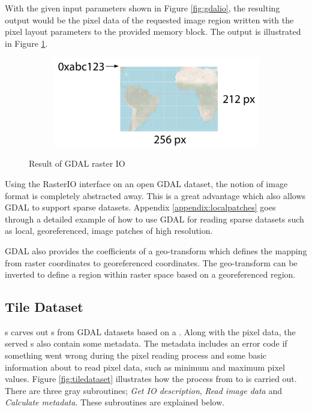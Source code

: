 With the given input parameters shown in Figure \ref{fig:gdalio}, the resulting output would be the pixel data of the requested image region written with the pixel layout parameters to the provided memory block. The output is illustrated in Figure \ref{fig:gdalioresult}.

\begin{figure}[htbp]
    \centering
    \begin{subfigure}[bt]{0.5\textwidth}
        \includegraphics[width=\textwidth]{figures/implementation/pipeline/gdalioresult.pdf}
    \end{subfigure}
    \caption{Result of GDAL raster IO}
    \label{fig:gdalioresult}
\end{figure}

Using the RasterIO interface on an open GDAL dataset, the notion of image format is completely abstracted away. This is a great advantage which also allows GDAL to support sparse datasets. Appendix \ref{appendix:localpatches} goes through a detailed example of how to use GDAL for reading sparse datasets such as local, georeferenced, image patches of high resolution.

GDAL also provides the coefficients of a geo-transform which defines the mapping from raster coordinates to georeferenced coordinates. The geo-transform can be inverted to define a region within raster space based on a georeferenced region.

\subsection{Tile Dataset}
s carves out s from GDAL datasets based on a . Along with the pixel data, the served s also contain some metadata. The metadata includes an error code if something went wrong during the pixel reading process and some basic information about to read pixel data, such as minimum and maximum pixel values. Figure \ref{fig:tiledataset} illustrates how the process from  to  is carried out. There are three gray subroutines; \emph{Get IO description}, \emph{Read image data} and \emph{Calculate metadata}. These subroutines are explained below.

